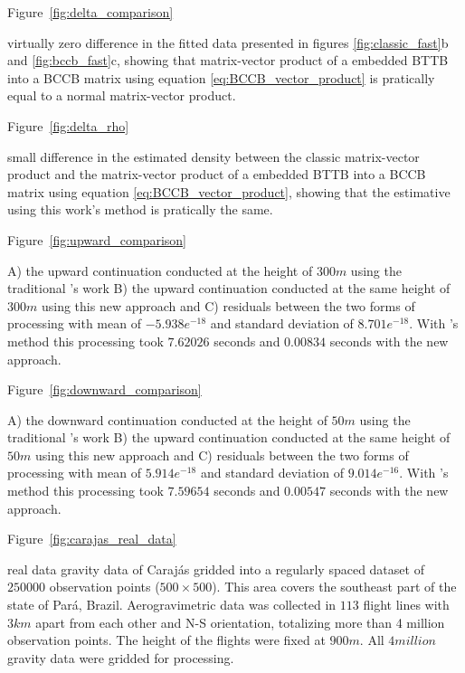 \documentclass[paper]{geophysics}
\begin{document}
Figure~\ref{fig:delta_comparison}

{virtually zero difference in the fitted data presented in figures \ref{fig:classic_fast}b and \ref{fig:bccb_fast}c, showing that matrix-vector product of a embedded BTTB into a BCCB matrix using equation \ref{eq:BCCB_vector_product} is pratically equal to a normal matrix-vector product.}
\newpage

Figure~\ref{fig:delta_rho}

{small difference in the estimated density between the classic matrix-vector product and the matrix-vector product of a embedded BTTB into a BCCB matrix using equation \ref{eq:BCCB_vector_product}, showing that the estimative using this work's method is pratically the same.}
\newpage

Figure~\ref{fig:upward_comparison}

{A) the upward continuation conducted at the height of $300 m$ using the traditional \cite{siqueira2017fast}'s work B) the upward continuation conducted at the same height of $300 m$ using this new approach and C) residuals between the two forms of processing with mean of $-5.938e^{-18}$ and standard deviation of $8.701e^{-18}$. With \cite{siqueira2017fast}'s method this processing took $7.62026$ seconds and $0.00834$ seconds with the new approach.}
\newpage

Figure~\ref{fig:downward_comparison}

{A) the downward continuation conducted at the height of $50 m$ using the traditional \cite{siqueira2017fast}'s work B) the upward continuation conducted at the same height of $50 m$ using this new approach and C) residuals between the two forms of processing with mean of $5.914e^{-18}$ and standard deviation of $9.014e^{-16}$. With \cite{siqueira2017fast}'s method this processing took $7.59654$ seconds and $0.00547$ seconds with the new approach.}
\newpage

Figure~\ref{fig:carajas_real_data}

{real data gravity data of Caraj\'as gridded into a regularly spaced dataset of $250000$ observation points ($500 \times 500$). This area covers the southeast part of the state of Par\'a, Brazil. Aerogravimetric data was collected in $113$ flight lines with $3 km$ apart from each other and N-S orientation, totalizing more than 4 million observation points. The height of the flights were fixed at $900 m$. All $4 million$ gravity data were gridded for processing.}
\newpage
\end{document}
